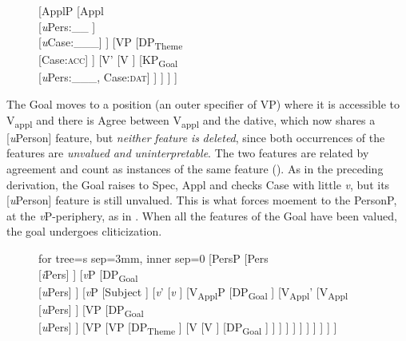 \documentclass[output=paper,modfonts,nonflat,newtxmath]{langsci/langscibook}
\begin{document}
\begin{figure}%
	\begin{forest}
		[ApplP
			[Appl\\
				{[}\textit{u}Pers:\_\_ {]}\\
				{[}\textit{u}Case:\_\_\_{]}
			]
			[VP
				[DP\textsubscript{Theme} \\
				 {[}Case:\textsc{acc}{]}
				]
				[V'
					[V
					]
					[KP\textsubscript{Goal}\\{[}\textit{u}Pers:\_\_\_{,} Case:\textsc{dat}{]}
					]
				]
			]
		]	
	\end{forest}
	\caption{\label{fig:cornilescu:9} \missingcaption}
\end{figure}


The Goal moves to a position (an outer specifier of VP) where it is accessible to V\textsubscript{appl} and there is Agree between V\textsubscript{appl} and the dative, which now shares a [\textit{u}Person] feature, but \textit{neither} \textit{feature} \textit{is} \textit{deleted}, since both occurrences of the features are \textit{unvalued} \textit{and} \textit{uninterpretable}. The two features are related by agreement and count as instances of the same feature (\citealt{PesetskyTorrego2007}). As in the preceding derivation, the Goal raises to Spec, Appl and checks Case with little \textit{v}, but its [\textit{u}Person] feature is still unvalued. This is what forces moement to the PersonP, at the  \textit{v}P-periphery, as in . When all the features of the Goal have been valued, the goal undergoes cliticization.

  
 \begin{figure}%
	\begin{forest}
	for tree={s sep=3mm, inner sep=0}
		[PersP
			[Pers\\
				{[}\textit{i}Pers{]}
			]
			[\textit{v}P
				[DP\textsubscript{Goal}\\
					{[}\textit{u}Pers{]}
				]
				[\textit{v}P
					[Subject
					]
					[\textit{v}’
						[\textit{v}
						]
						[V\textsubscript{Appl}P
							[DP\textsubscript{Goal}
							]
							[V\textsubscript{Appl}'
								[V\textsubscript{Appl}\\
								 {[}\textit{u}Pers{]}
								]
								[VP
									[DP\textsubscript{Goal}\\
									 {[}\textit{u}Pers{]}
									]
									[VP
										[VP
											[DP\textsubscript{Theme}
											]
											[V
												[V
												]
												[DP\textsubscript{Goal}
												]
											]
										]
									]
								]
							]
						]
					]
				]
			]
		]	
 	\end{forest}
	\caption{\label{fig:cornilescu:10} \missingcaption}
\end{figure}
\end{document}
